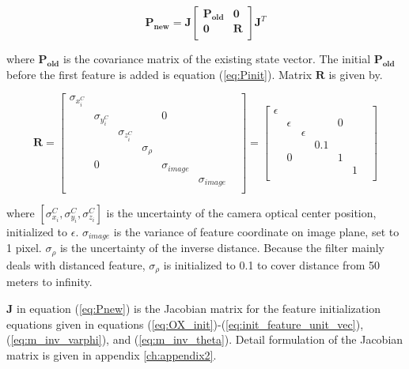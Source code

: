 \begin{equation}
\label{eq:Pnew}
\mathbf{P_{new}}=\mathbf{J}\begin{bmatrix}
\mathbf{P_{old}} & \mathbf{0} \\
\mathbf{0} & \mathbf{R} \\
\end{bmatrix}
\mathbf{J}^{T}
\end{equation}

\noindent where $\mathbf{P_{old}}$ is the covariance matrix of the existing
state vector. The initial $\mathbf{P_{old}}$ before the first feature is
added is equation (\ref{eq:Pinit}). Matrix $\mathbf{R}$ is given by.

\begin{equation}
\label{eq:R}
\mathbf{R}=\begin{bmatrix}
\sigma _{x_{i}^{C}} & & & & & & \\
 & \sigma _{y_{i}^{C}} & & & 0 & & \\
 & & \sigma _{z_{i}^{C}} & & & & \\
 & & & \sigma _{\rho } & & & \\
 & 0 & & & \sigma _{image} & & \\
 & & & & & \sigma _{image} & \\
\end{bmatrix}
 = \begin{bmatrix}
\epsilon & & & & & & \\
 & \epsilon & & & 0 & & \\
 & & \epsilon & & & & \\
 & & & 0.1 & & & \\
 & 0 & & & 1 & & \\
 & & & & & 1 & \\
\end{bmatrix} 
\end{equation}

\noindent where $[\sigma_{x_{i}}^{C}, \sigma_{y_{i}}^{C}, \sigma
_{z_{i}}^{C}]$ is the uncertainty of the camera optical center
position, initialized to $\epsilon$. $\sigma_{image}$ is the
variance of feature coordinate on image plane, set to 1 pixel. $\sigma
_{\rho }$ is the uncertainty of the inverse distance. Because the
filter mainly deals with distanced feature, $ \sigma _{\rho }$ is
initialized to 0.1 to cover distance from 50 meters to infinity.

$\mathbf{J}$ in equation (\ref{eq:Pnew}) is the Jacobian matrix for
the feature initialization equations given in equations
(\ref{eq:OX_init})-(\ref{eq:init_feature_unit_vec}),
(\ref{eq:m_inv_varphi}), and (\ref{eq:m_inv_theta}). Detail
formulation of the Jacobian matrix is given in appendix
\ref{ch:appendix2}.



